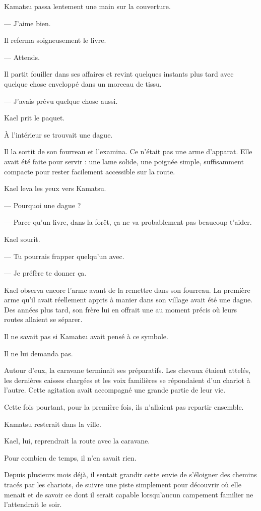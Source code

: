 Kamatsu passa lentement une main sur la couverture.

— J'aime bien.

Il referma soigneusement le livre.

— Attends.

Il partit fouiller dans ses affaires et revint quelques instants plus tard avec
quelque chose enveloppé dans un morceau de tissu.

— J'avais prévu quelque chose aussi.

Kael prit le paquet.

À l'intérieur se trouvait une dague.

Il la sortit de son fourreau et l'examina. Ce n'était pas une arme d'apparat.
Elle avait été faite pour servir : une lame solide, une poignée simple,
suffisamment compacte pour rester facilement accessible sur la route.

Kael leva les yeux vers Kamatsu.

— Pourquoi une dague ?

— Parce qu'un livre, dans la forêt, ça ne va probablement pas beaucoup
t'aider.

Kael sourit.

— Tu pourrais frapper quelqu'un avec.

— Je préfère te donner ça.

Kael observa encore l'arme avant de la remettre dans son fourreau. La première
arme qu'il avait réellement appris à manier dans son village avait été une
dague. Des années plus tard, son frère lui en offrait une au moment précis où
leurs routes allaient se séparer.

Il ne savait pas si Kamatsu avait pensé à ce symbole.

Il ne lui demanda pas.

\scenebreak

Autour d'eux, la caravane terminait ses préparatifs. Les chevaux étaient
attelés, les dernières caisses chargées et les voix familières se répondaient
d'un chariot à l'autre. Cette agitation avait accompagné une grande partie de
leur vie.

Cette fois pourtant, pour la première fois, ils n'allaient pas repartir
ensemble.

Kamatsu resterait dans la ville.

Kael, lui, reprendrait la route avec la caravane.

Pour combien de temps, il n'en savait rien.

Depuis plusieurs mois déjà, il sentait grandir cette envie de s'éloigner des
chemins tracés par les chariots, de suivre une piste simplement pour découvrir
où elle menait et de savoir ce dont il serait capable lorsqu'aucun campement
familier ne l'attendrait le soir.

